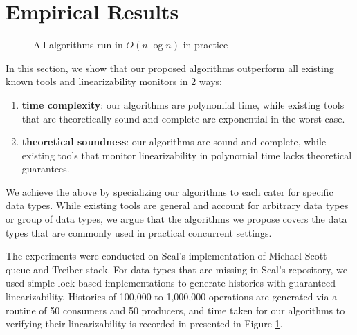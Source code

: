 
\section{Empirical Results}

\begin{figure}
\caption{All algorithms run in $O(n \log{n})$ in practice}
\label{graph-oper}
\end{figure}

In this section, we show that our proposed algorithms outperform all existing known tools and linearizability monitors in 2 ways:

\begin{enumerate}
    \item \textbf{time complexity}: our algorithms are polynomial time, while existing tools that are theoretically sound and complete are exponential in the worst case.
    \item \textbf{theoretical soundness}: our algorithms are sound and complete, while existing tools that monitor linearizability in polynomial time lacks theoretical guarantees.
\end{enumerate}

We achieve the above by specializing our algorithms to each cater for specific data types. While existing tools are general and account for arbitrary data types or group of data types, we argue that the algorithms we propose covers the data types that are commonly used in practical concurrent settings.

The experiments were conducted on Scal's implementation of Michael Scott queue and Treiber stack. For data types that are missing in Scal's repository, we used simple lock-based implementations to generate histories with guaranteed linearizability. Histories of 100,000 to 1,000,000 operations are generated via a routine of 50 consumers and 50 producers, and time taken for our algorithms to verifying their linearizability is recorded in presented in Figure \ref{graph-oper}.

